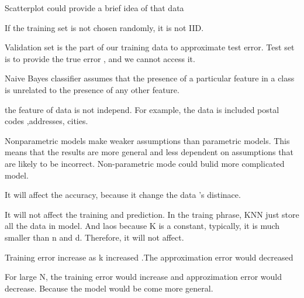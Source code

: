 \documentclass{article}
\def\red#1{{\color{red}#1}}
\begin{document}
\begin{enumerate}
\red{
\item  Scatterplot could provide a brief idea of that data 
\item  If the training set is not chosen randomly, it is not IID. 
\item Validation set is the part of our training data to approximate test error. Test set is to provide the true error , and we cannot access it.
\item Naive Bayes classifier assumes that the presence of a particular feature in a class is unrelated to the presence of any other feature.
\item the feature of data is not independ. For example, the data is included postal codes ,addresses, cities. 
\item Nonparametric models make weaker assumptions than parametric models. This means that the results are more general and less dependent on assumptions that are likely to be incorrect. Non-parametric mode could bulid more complicated model.
\item It will affect the accuracy, because it change the data 's distinace. 
\item It will not affect the training and prediction. In the traing phrase, KNN just store all the data in model. And laos because K is a constant, typically, it is much smaller than n and d. Therefore, it will not affect.
\item Training error increase as k increased .The approximation error would decreased
\item For large N, the training error would increase and approzimation error would decrease. Because the model would be come more general.
}


\end{enumerate}
\end{document}
